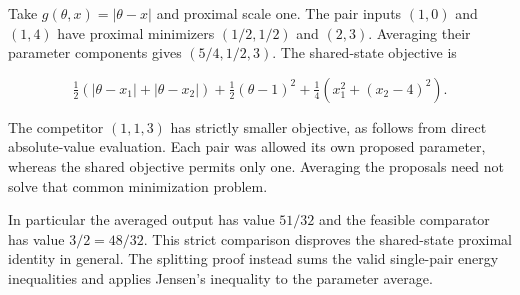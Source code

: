 \documentclass[11pt,a4paper]{report}
\begin{document}
Take \(g(\theta,x)=|\theta-x|\) and proximal scale one. The pair inputs \((1,0)\) and \((1,4)\) have proximal minimizers \((1/2,1/2)\) and \((2,3)\). Averaging their parameter components gives \((5/4,1/2,3)\). The shared-state objective is

\[\tfrac12(|\theta-x_1|+|\theta-x_2|)+\tfrac12(\theta-1)^2+\tfrac14(x_1^2+(x_2-4)^2).\]

The competitor \((1,1,3)\) has strictly smaller objective, as follows from direct absolute-value evaluation. Each pair was allowed its own proposed parameter, whereas the shared objective permits only one. Averaging the proposals need not solve that common minimization problem.



In particular the averaged output has value \(51/32\) and the feasible comparator has value \(3/2=48/32\). This strict comparison disproves the shared-state proximal identity in general. The splitting proof instead sums the valid single-pair energy inequalities and applies Jensen’s inequality to the parameter average.
\end{document}
